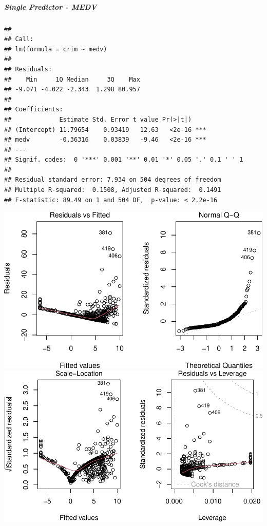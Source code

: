 \documentclass[
]{article}
\begin{document}
\hypertarget{single-predictor---medv}{%
\subparagraph{\texorpdfstring{\textbf{Single Predictor -
MEDV}}{Single Predictor - MEDV}}\label{single-predictor---medv}}

\begin{verbatim}
## 
## Call:
## lm(formula = crim ~ medv)
## 
## Residuals:
##    Min     1Q Median     3Q    Max 
## -9.071 -4.022 -2.343  1.298 80.957 
## 
## Coefficients:
##             Estimate Std. Error t value Pr(>|t|)    
## (Intercept) 11.79654    0.93419   12.63   <2e-16 ***
## medv        -0.36316    0.03839   -9.46   <2e-16 ***
## ---
## Signif. codes:  0 '***' 0.001 '**' 0.01 '*' 0.05 '.' 0.1 ' ' 1
## 
## Residual standard error: 7.934 on 504 degrees of freedom
## Multiple R-squared:  0.1508, Adjusted R-squared:  0.1491 
## F-statistic: 89.49 on 1 and 504 DF,  p-value: < 2.2e-16
\end{verbatim}

\includegraphics{Disha_Gandhi_Take_Home_Exam_PDF_files/figure-latex/unnamed-chunk-30-1.pdf}
\includegraphics{Disha_Gandhi_Take_Home_Exam_PDF_files/figure-latex/unnamed-chunk-30-2.pdf}
\end{document}
